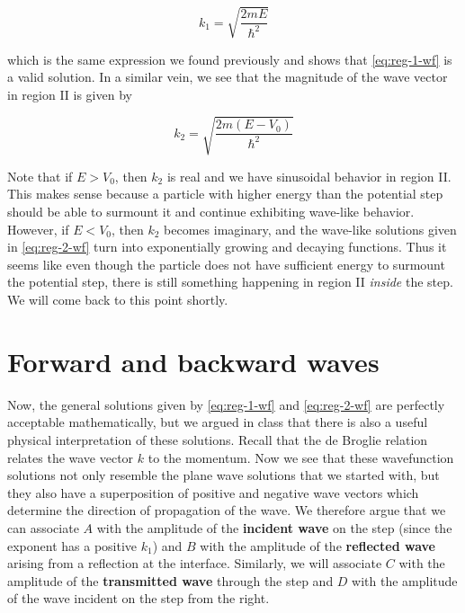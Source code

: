 \begin{equation}
	k_1 = \sqrt{\frac{2mE}{\hbar^2}} \label{eq:reg-1-k}
\end{equation}

\noindent which is the same expression we found previously and shows that \autoref{eq:reg-1-wf} is a valid solution. 
In a similar vein, we see that the magnitude of the wave vector in region II is given by 

\begin{equation}
	k_2 = \sqrt{\frac{2m(E-V_0)}{\hbar^2}} \label{eq:reg-2-k}
\end{equation}

Note that if $E > V_0$, then $k_2$ is real and we have sinusoidal behavior in region II. 
This makes sense because a particle with higher energy than the potential step should be able to surmount it and continue exhibiting wave-like behavior. 
However, if $E < V_0$, then $k_2$ becomes imaginary, and the wave-like solutions given in \autoref{eq:reg-2-wf} turn into exponentially growing and decaying functions. 
Thus it seems like even though the particle does not have sufficient energy to surmount the potential step, there is still something happening in region II \emph{inside} the step. 
We will come back to this point shortly.


\section{Forward and backward waves}

Now, the general solutions given by \autoref{eq:reg-1-wf} and \ref{eq:reg-2-wf} are perfectly acceptable mathematically, but we argued in class that there is also a useful physical interpretation of these solutions. 
Recall that the de Broglie relation relates the wave vector $k$ to the momentum. 
Now we see that these wavefunction solutions not only resemble the plane wave solutions that we started with, but they also have a superposition of positive and negative wave vectors which determine the direction of propagation of the wave. 
We therefore argue that we can associate $A$ with the amplitude of the \textbf{incident wave} on the step (since the exponent has a positive $k_1$) and $B$ with the amplitude of the \textbf{reflected wave} arising from a reflection at the interface. 
Similarly, we will associate $C$ with the amplitude of the \textbf{transmitted wave} through the step and $D$ with the amplitude of the wave incident on the step from the right.

